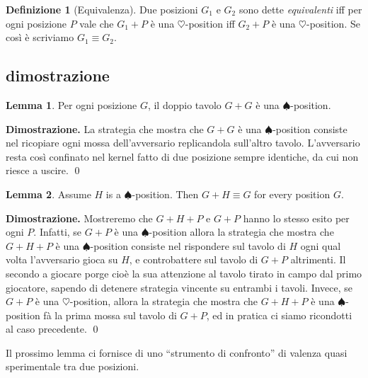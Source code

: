 \documentclass[a4paper, 10pt]{report}
\newenvironment{dimostrazione}{\textbf{Dimostrazione.} }{ \qed}
\theoremstyle{definition} %
\newtheorem{lemma}{Lemma}
\newtheorem{definizione}{Definizione}
\begin{document}
\begin{definizione}[Equivalenza]
  \label{def:equivalenza}
Due posizioni $G_1$ e $G_2$ sono dette \emph{equivalenti}
iff per ogni posizione $P$
vale che $G_1+P$ è una $\heartsuit$-position
iff $G_2+P$ è una $\heartsuit$-position.
Se così è scriviamo $G_1\equiv G_2$.
\end{definizione}

\subsection*{dimostrazione}

\begin{lemma} \label{lem:twin}
  Per ogni posizione $G$, il doppio tavolo $G+G$
  è una $\spadesuit$-position.
\end{lemma}
\begin{dimostrazione}
  La strategia che mostra che $G+G$ è una $\spadesuit$-position
  consiste nel ricopiare ogni mossa dell'avversario replicandola sull'altro tavolo. L'avversario resta così confinato nel kernel fatto di due posizione sempre identiche, da cui non riesce a uscire.
\end{dimostrazione}


\begin{lemma} \label{lem:adding-loosing-positions-has-no-effect}
  Assume $H$ is a $\spadesuit$-position.
  Then $G+H \equiv G$ for every position $G$.
\end{lemma}
\begin{dimostrazione}
  Mostreremo che $G+H+P$ e $G+P$ hanno lo stesso esito per ogni $P$.
  Infatti, se $G+P$ è una $\spadesuit$-position
  allora la strategia che mostra che $G+H+P$ è una $\spadesuit$-position
  consiste nel rispondere sul tavolo di $H$ ogni qual volta l'avversario gioca
  su $H$, e controbattere sul tavolo di $G+P$
  altrimenti.
  Il secondo a giocare porge cioè la sua attenzione al tavolo tirato in campo
  dal primo giocatore, sapendo di detenere strategia vincente su entrambi i tavoli.
  Invece, se $G+P$ è una $\heartsuit$-position,
  allora la strategia che mostra che $G+H+P$ è una $\spadesuit$-position
  fà la prima mossa sul tavolo di $G+P$,
  ed in pratica ci siamo ricondotti al caso precedente.
\end{dimostrazione}

Il prossimo lemma ci fornisce di uno ``strumento di confronto'' di valenza quasi sperimentale tra due posizioni.
\end{document}
